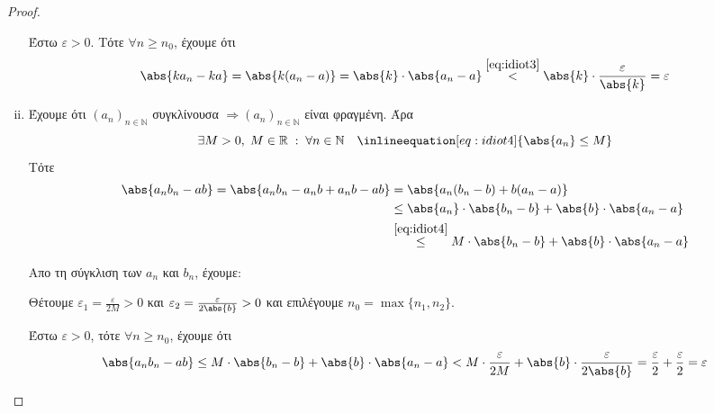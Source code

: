 \documentclass[main.tex]{subfiles}
\begin{document}
\begin{proof}
\begin{enumerate}[i)]
            Έστω $ \varepsilon >0 $. Τότε $ \forall n \geq n_{0} $, 
            έχουμε ότι 
            \[
                \abs{k a_{n}- ka} = \abs{k(a_{n}- a)} = \abs{k} \cdot 
                \abs{a_{n}- a} \overset{\eqref{eq:idiot3}}{<} \abs{k}
                \cdot \frac{\varepsilon}{\abs{k}} = \varepsilon 
            \] 

        \item Έχουμε ότι $ (a_{n})_{n \in \mathbb{N}} $ συγκλίνουσα $ 
            \Rightarrow (a_{n})_{n \in \mathbb{N}} $ είναι φραγμένη. 
            Άρα 
            \[ 
                \exists M >0, \; M \in \mathbb{R} \; : \; \forall n \in 
                \mathbb{N} \quad \inlineequation[eq:idiot4]{\abs{a_{n}} 
                \leq M}
            \] 
            Τότε 
            \begin{align*}
                \abs{a_{n} b_{n} - ab} = \abs{a_{n}b_{n} - a_{n}b + 
                a_{n}b -ab} &= \abs{a_{n}(b_{n}-b)+b(a_{n}-a) } \\
                            &\leq \abs{a_{n}}\cdot \abs{b_{n}-b} + \abs{b} 
                            \cdot \abs{a_{n}-a} \\
                            &\overset{\eqref{eq:idiot4}}{\leq} 
                            M \cdot  \abs{b_{n}-b} + \abs {b}\cdot 
                            \abs{a_{n}-a}
            \end{align*}

            Απο τη σύγκλιση των $ a_{n} $ και $ b_{n} $, έχουμε:

            Θέτουμε $ \varepsilon_{1} = \frac{\varepsilon}{2M} >0 $ 
            και $ \varepsilon_{2} = \frac{\varepsilon}{2\abs{b}} >0 $ 
            και επιλέγουμε $ n_{0}= \max \{ n_{1}, n_{2}\} $.

            Έστω $ \varepsilon >0 $, τότε $ \forall n \geq n_{0}$, 
            έχουμε ότι 
            \[
                \abs{a_{n} b_{n} - ab} \leq M \cdot \abs{b_{n}-b} + 
                \abs{b} \cdot \abs{a_{n}- a} < M \cdot 
                \frac{\varepsilon}{2 M} + \abs {b} \cdot 
                \frac{\varepsilon}{2 \abs{b}} =
                \frac{\varepsilon}{2} + \frac{\varepsilon}{2} = 
                \varepsilon
            \]


\end{enumerate}
\end{proof}
\end{document}
